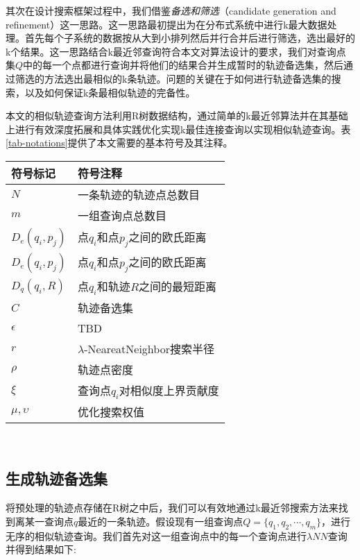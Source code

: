 其次在设计搜索框架过程中，我们借鉴\emph{备选和筛选}（candidate generation and refinement）这一思路。这一思路最初提出为在分布式系统中进行k最大数据处理。首先每个子系统的数据按从大到小排列然后并行合并后进行筛选，选出最好的k个结果。这一思路结合k最近邻查询符合本文对算法设计的要求，我们对查询点集$Q$中的每一个点都进行查询并将他们的结果合并生成暂时的轨迹备选集，然后通过筛选的方法选出最相似的k条轨迹。问题的关键在于如何进行轨迹备选集的搜索，以及如何保证k条最相似轨迹的完备性。

本文的相似轨迹查询方法利用R树数据结构，通过简单的k最近邻算法并在其基础上进行有效深度拓展和具体实践优化实现k最佳连接查询以实现相似轨迹查询。表\ref{tab-notations}提供了本文需要的基本符号及其注释。
\\
\begin{table}[!htpb]
  	\centering
		\begin{tabular}{ |p{3cm}||p{9cm}|  }
		\hline
		符号标记 & 符号注释 \\
		\hline
		$N$ & 一条轨迹的轨迹点总数目 \\
		\hline
		$m$ & 一组查询点总数目 \\
		\hline
		$D_{e}(q_{i},p_{j})$ & 点$q_{i}$和点$p_{j}$之间的欧氏距离 \\
		\hline
		$D_{e}(q_{i},p_{j})$ & 点$q_{i}$和点$p_{j}$之间的欧氏距离 \\
		\hline
		$D_{q}(q_{i},R)$ & 点$q_{i}$和轨迹$R$之间的最短距离 \\
		\hline
		$C$ & 轨迹备选集 \\
		\hline
		$\epsilon$ & TBD\\
		\hline
		$r$ & $\lambda$-NeareatNeighbor搜索半径\\
		\hline
		$\rho$ & 轨迹点密度\\
		\hline
		$\xi$ & 查询点$q_{i}$对相似度上界贡献度\\
		\hline
		$\mu,\upsilon$ & 优化搜索权值\\
		\hline
		\end{tabular}
\end{table}
\\

\subsection{生成轨迹备选集}
\label{subsec:candidate-generation}
将预处理的轨迹点存储在R树之中后，我们可以有效地通过k最近邻搜索方法来找到离某一查询点$q$最近的一条轨迹。假设现有一组查询点$Q = \{q_{1},q_{2},\cdots, q_{m}\}$，进行无序的相似轨迹查询。我们首先对这一组查询点中的每一个查询点进行$\lambda NN$查询并得到结果如下:

